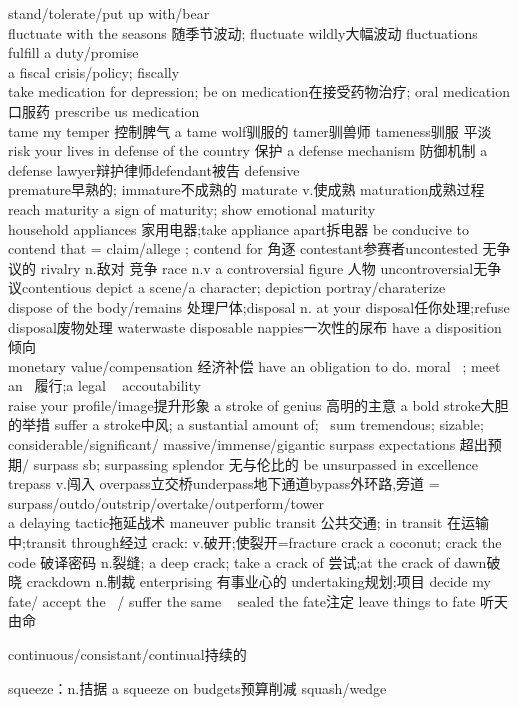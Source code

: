 \documentclass[a4paper,12pt]{article}
\begin{document}
stand/tolerate/put up with/bear
\\fluctuate with the seasons 随季节波动; fluctuate wildly大幅波动 fluctuations
fulfill a duty/promise
\\a fiscal crisis/policy;  fiscally 
\\take medication for depression; be on medication在接受药物治疗; oral medication口服药 prescribe us medication
\\tame my temper 控制脾气 a tame wolf驯服的 tamer驯兽师 tameness驯服 平淡
risk your lives in defense of the country 保护 a defense mechanism 防御机制 a defense lawyer辩护律师defendant被告 defensive
\\premature早熟的; immature不成熟的 maturate v.使成熟 maturation成熟过程 reach maturity 
a sign of maturity; show emotional maturity 
\\household appliances 家用电器;take appliance apart拆电器
be conducive to
contend that = claim/allege ; contend for 角逐
contestant参赛者uncontested 无争议的 rivalry n.敌对 竞争 race n.v
a controversial figure 人物 uncontroversial无争议contentious
depict a scene/a character; depiction
portray/charaterize 
\\dispose of the body/remains 处理尸体;disposal n. at your disposal任你处理;refuse disposal废物处理 waterwaste
disposable nappies一次性的尿布 have a disposition倾向
\\monetary value/compensation 经济补偿
have an obligation to do. moral ~; meet an ~履行;a legal ~
accoutability 
\\raise your profile/image提升形象
a stroke of genius 高明的主意 a bold stroke大胆的举措 suffer a stroke中风;
a sustantial amount of; ~sum
tremendous; sizable; considerable/significant/ massive/immense/gigantic 
surpass expectations 超出预期/ surpass sb;
surpassing splendor 无与伦比的 be unsurpassed in excellence 
trepass v.闯入 overpass立交桥underpass地下通道bypass外环路,旁道
= surpass/outdo/outstrip/overtake/outperform/tower 
\\a delaying tactic拖延战术 maneuver
public transit 公共交通; in transit 在运输中;transit through经过
crack: v.破开;使裂开=fracture crack a coconut; crack the code 破译密码
 	n.裂缝; a deep crack; take a crack of 尝试;at the crack of dawn破晓
crackdown n.制裁
enterprising 有事业心的 undertaking规划;项目
decide my fate/ accept the ~/ suffer the same ~
sealed the fate注定 leave things to fate 听天由命

continuous/consistant/continual持续的

squeeze：n.拮据 a squeeze on budgets预算削减 squash/wedge
\end{document}
